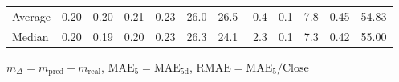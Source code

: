 \begin{threeparttable}
{\begin{tabular}{lrrrrrrrrrrr}
Average &          0.20 &          0.20 &          0.21 &        0.23 &                26.0 &                26.5 &       -0.4 &                 0.1 &              7.8 &            0.45 &                  54.83 \\
 Median &          0.20 &          0.19 &          0.20 &        0.23 &                26.3 &                24.1 &        2.3 &                 0.1 &              7.3 &            0.42 &                  55.00 \\
\bottomrule
\end{tabular}
}
\begin{tablenotes}\footnotesize
\item $m_\Delta=m_{\text{pred}}-m_{\text{real}}$,
$\mathrm{MAE}_5=\mathrm{MAE}_{5\text{d}}$,
$\mathrm{RMAE}=\mathrm{MAE}_5/\text{Close}$
\end{tablenotes}
\end{threeparttable}
\endgroup

